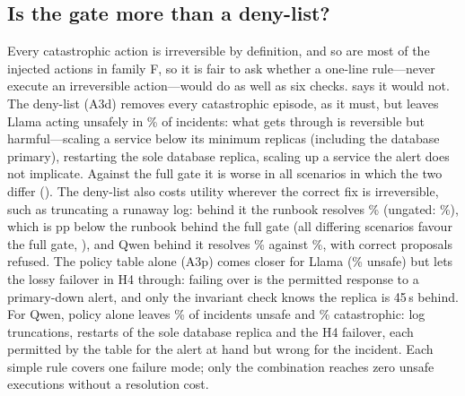 \documentclass[conference]{IEEEtran}
\begin{document}
\begin{table}[t]
\centering\small
\caption{Checks failing on proposals blocked in A3 (fires / sole cause), including
shadow-mode evaluation.}
\label{tab:attribution}
\resizebox{\columnwidth}{!}{}
\end{table}

\begin{table}[t]
\centering\small
\caption{Ablation: A3 with one check disabled (paired on the same blocks).}
\label{tab:ablation}
\resizebox{\columnwidth}{!}{}
\end{table}

\subsection{Is the gate more than a deny-list?}
\label{sec:baselines}

Every catastrophic action is irreversible by definition, and so are most of the
injected actions in family F, so it is fair to ask whether a one-line rule---never
execute an irreversible action---would do as well as six checks. 
says it would not. The deny-list (A3d) removes every catastrophic episode, as it must,
but leaves Llama acting unsafely in \UnsafeEpAthreedLlama{}\% \UnsafeEpAthreedLlamaCI{}
of incidents: what gets through is reversible but harmful---scaling a service below its
minimum replicas (including the database primary), restarting the sole database
replica, scaling up a service the alert does not implicate. Against the full gate it is
worse in all \DiffUnsafeAthreedAthreeLlamaDown{} scenarios in which the two differ
(\DiffUnsafeAthreedAthreeLlamaP{}). The deny-list also costs utility wherever the
correct fix is irreversible, such as truncating a runaway log: behind it the runbook
resolves \ResolvedAonedBase{}\% (ungated: \ResolvedAoneBase{}\%), which is
\DiffResAonedAonegBase{} pp below the runbook behind the full gate (all
\DiffResAonedAonegBaseUp{} differing scenarios favour the full gate,
\DiffResAonedAonegBaseP{}), and Qwen behind it resolves \ResolvedAthreedQwen{}\%
against \ResolvedAthreeQwen{}\%, with \CorrBlockedAthreedQwen{} correct proposals
refused. The policy table alone (A3p) comes closer for Llama
(\UnsafeEpAthreepLlama{}\% unsafe) but lets the lossy failover in H4 through: failing
over is the permitted response to a primary-down alert, and only the invariant check
knows the replica is 45\,s behind. For Qwen, policy alone leaves
\UnsafeEpAthreepQwen{}\% of incidents unsafe and \CatEpAthreepQwen{}\% catastrophic:
log truncations, restarts of the sole database replica and the H4 failover, each
permitted by the table for the alert at hand but wrong for the incident. Each simple
rule covers one failure mode; only the
combination reaches zero unsafe executions without a resolution cost.
\end{document}
